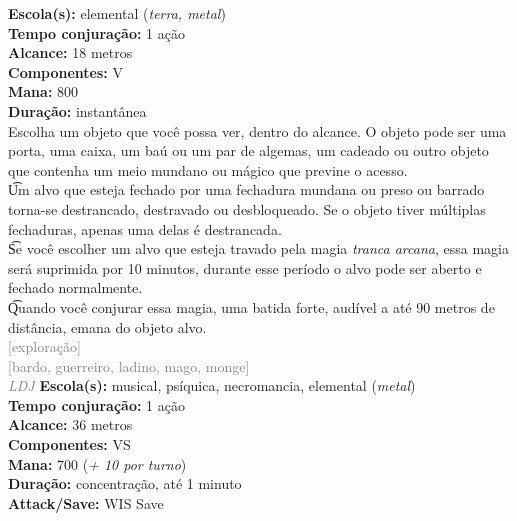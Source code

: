 \documentclass{RPG_Adventure}[2021/10/20]
\begin{document}
{\small \t \textbf{Escola(s):} elemental (\textit{terra, metal})\\\t \textbf{Tempo conjuração:} 1 ação\\\t \textbf{Alcance:} 18 metros\\\t \textbf{Componentes:} V\\\t \textbf{Mana:} 800\\\t \textbf{Duração:} instantânea\\}
{\normalsize Escolha um objeto que você possa ver, dentro do alcance. O objeto pode ser uma porta, uma caixa, um baú ou um par de algemas, um cadeado ou outro objeto que contenha um meio mundano ou mágico que previne o acesso.\\\t Um alvo que esteja fechado por uma fechadura mundana ou preso ou barrado torna-se destrancado, destravado ou desbloqueado. Se o objeto tiver múltiplas fechaduras, apenas uma delas é destrancada.\\\t Se você escolher um alvo que esteja travado pela magia \textit{tranca arcana}, essa magia será suprimida por 10 minutos, durante esse período o alvo pode ser aberto e fechado normalmente.\\\t Quando você conjurar essa magia, uma batida forte, audível a até 90 metros de distância, emana do objeto alvo.\\}
{\scriptsize \textcolor{gray}{[exploração]\\}}
{\scriptsize \textcolor{gray}{[bardo, guerreiro, ladino, mago, monge]\\}}
{\tiny \textcolor{gray}{\textit{LDJ}}}\jump{}
{\small \t \textbf{Escola(s):} musical, psíquica, necromancia, elemental (\textit{metal})\\\t \textbf{Tempo conjuração:} 1 ação\\\t \textbf{Alcance:} 36 metros\\\t \textbf{Componentes:} VS\\\t \textbf{Mana:} 700 (\textit{+ 10 por turno})\\\t \textbf{Duração:} concentração, até 1 minuto\\\t \textbf{Attack/Save:} WIS Save\\}
\end{document}
